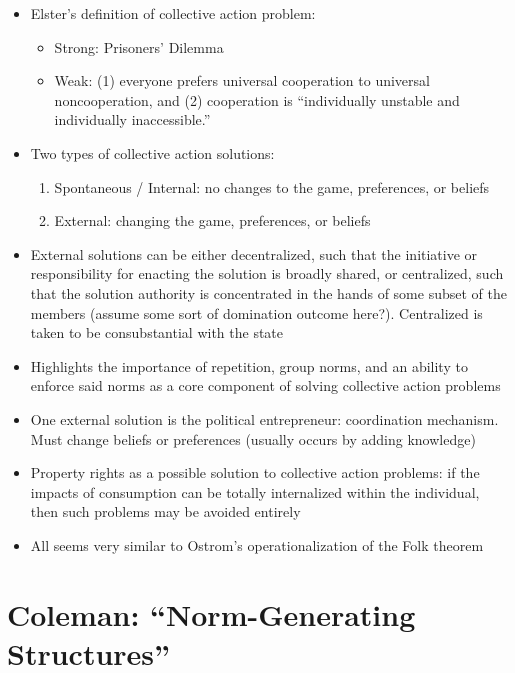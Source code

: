 \documentclass[12pt]{article}
\begin{document}
\begin{itemize}
    \item Elster's definition of collective action problem:
    \begin{itemize}
        \item Strong: Prisoners' Dilemma
        \item Weak: (1) everyone prefers universal cooperation to universal noncooperation, and (2) cooperation is ``individually unstable and individually inaccessible.''
    \end{itemize}
    \item Two types of collective action solutions:
    \begin{enumerate}
        \item Spontaneous / Internal: no changes to the game, preferences, or beliefs
        \item External: changing the game, preferences, or beliefs
    \end{enumerate}
    \item External solutions can be either decentralized, such that the initiative or responsibility for enacting the solution is broadly shared, or centralized, such that the solution authority is concentrated in the hands of some subset of the members (assume some sort of domination outcome here?). Centralized is taken to be consubstantial with the state
    \item Highlights the importance of repetition, group norms, and an ability to enforce said norms as a core component of solving collective action problems
    \item One external solution is the political entrepreneur: coordination mechanism. Must change beliefs or preferences (usually occurs by adding knowledge)
    \item Property rights as a possible solution to collective action problems: if the impacts of consumption can be totally internalized within the individual, then such problems may be avoided entirely
    \item All seems very similar to Ostrom's operationalization of the Folk theorem
\end{itemize}


\section{Coleman: ``Norm-Generating Structures''}
\end{document}
